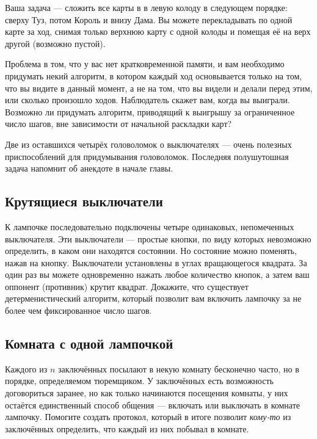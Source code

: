 Ваша задача --- сложить все карты в в левую колоду в следующем порядке: сверху Туз, потом Король и внизу Дама.
Вы можете перекладывать по одной карте за ход, снимая только верхнюю карту с одной колоды и помещая её на верх другой (возможно пустой).

Проблема в том, что у вас нет кратковременной памяти, и вам необходимо придумать некий алгоритм, в котором каждый ход основывается только на том, что вы видите в данный момент, а не на том, что вы видели и делали перед этим, или сколько произошло ходов.
Наблюдатель скажет вам, когда вы выиграли.
Возможно ли придумать алгоритм, приводящий к выигрышу за ограниченное число шагов, вне зависимости от начальной раскладки карт?

\medskip

Две из оставшихся четырёх головоломок о выключателях --- очень полезных приспособлений для придумывания головоломок.
Последняя полушутошная задача напомнит об анекдоте в начале главы.

\subsection*{Крутящиеся выключатели}%

К лампочке последовательно подключены четыре одинаковых, непомеченных выключателя.
Эти выключатели --- простые кнопки, по виду которых невозможно определить, в каком они находятся состоянии.
Но состояние можно поменять, нажав на кнопку.
Выключатели установлены в углах вращающегося квадрата.
За один раз вы можете одновременно нажать любое количество кнопок, а затем ваш оппонент (противник) крутит квадрат.
Докажите, что существует детерменистический %
алгоритм, который позволит вам включить лампочку за не более чем фиксированное число шагов.

\subsection*{Комната с одной лампочкой}%

Каждого из $n$ заключённых посылают в некую комнату бесконечно часто, но в порядке, определяемом тюремщиком.
У заключённых есть возможность договориться заранее, но как только начинаются посещения комнаты, у них остаётся единственный способ общения --- включать или выключать в комнате лампочку.
Помогите создать протокол, который в итоге позволит \emph{кому-то} из заключённых определить, что каждый из них побывал в комнате.

